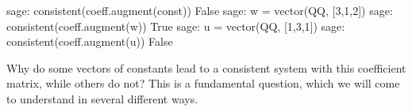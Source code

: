 %
\begin{sageexample}
sage: consistent(coeff.augment(const))
False
sage: w = vector(QQ, [3,1,2])
sage: consistent(coeff.augment(w))
True
sage: u = vector(QQ, [1,3,1])
sage: consistent(coeff.augment(u))
False
\end{sageexample}
%
Why do some vectors of constants lead to a consistent system with this coefficient matrix, while others do not?  This is a fundamental question, which we will come to understand in several different ways.
%
\begin{sageverbatim}
\end{sageverbatim}
%